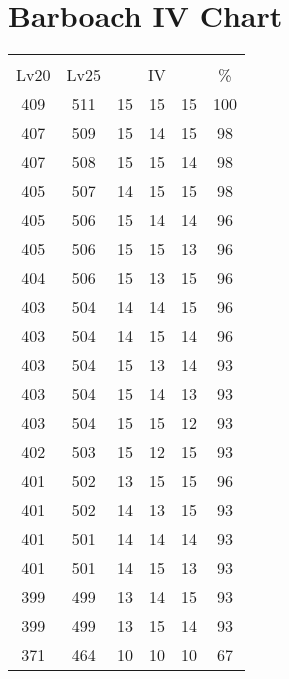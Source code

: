 \documentclass{article}%
\begin{document}
%
\normalsize%
\section{Barboach IV Chart}%
\label{sec:Barboach IV Chart}%
\renewcommand{\arraystretch}{1.5}%
\begin{tabular}{|c|c|c|c|c|c|}%
\hline%
\multicolumn{6}{|c|}{\textcolor{white}{ 
\linebreak{Barboach}
}%
\cellcolor{black}}\\%
\multicolumn{1}{|c}{Lv20}&\multicolumn{1}{c|}{Lv25}&\multicolumn{3}{c|}{IV}&\multicolumn{1}{|c|}{\%}\\%
\hline%
\rowcolor{color100}%
409&511&15&15&15&100\\%
\hline%
\rowcolor{color98}%
407&509&15&14&15&98\\%
\hline%
\rowcolor{color98}%
407&508&15&15&14&98\\%
\hline%
\rowcolor{color98}%
405&507&14&15&15&98\\%
\hline%
\rowcolor{color96}%
405&506&15&14&14&96\\%
\hline%
\rowcolor{color96}%
405&506&15&15&13&96\\%
\hline%
\rowcolor{color96}%
404&506&15&13&15&96\\%
\hline%
\rowcolor{color96}%
403&504&14&14&15&96\\%
\hline%
\rowcolor{color96}%
403&504&14&15&14&96\\%
\hline%
\rowcolor{color93}%
403&504&15&13&14&93\\%
\hline%
\rowcolor{color93}%
403&504&15&14&13&93\\%
\hline%
\rowcolor{color93}%
403&504&15&15&12&93\\%
\hline%
\rowcolor{color93}%
402&503&15&12&15&93\\%
\hline%
\rowcolor{color96}%
401&502&13&15&15&96\\%
\hline%
\rowcolor{color93}%
401&502&14&13&15&93\\%
\hline%
\rowcolor{color93}%
401&501&14&14&14&93\\%
\hline%
\rowcolor{color93}%
401&501&14&15&13&93\\%
\hline%
\rowcolor{color93}%
399&499&13&14&15&93\\%
\hline%
\rowcolor{color93}%
399&499&13&15&14&93\\%
\hline%
\rowcolor{color91}%
371&464&10&10&10&67\\%
\end{tabular}

%
\end{document}
